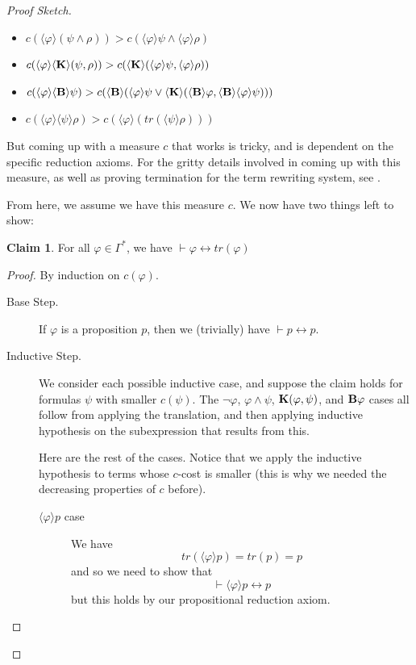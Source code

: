 \documentclass[letterpaper]{article}
\theoremstyle{definition}
\newtheorem{claim}{Claim}
\newenvironment{sketch}{\begin{proof}[Proof Sketch]}{\end{proof}}
\newcommand{\proves}{\vdash}
\newcommand{\Believe}[1]{\textrm{\textup{\textbf{B}}} #1}
\newcommand{\Know}[2]{\textrm{\textup{\textbf{K}}}(#1, #2)}
\newcommand{\diaBelieve}[1]{\langle \textrm{\textup{\textbf{B}}} \rangle #1}
\newcommand{\diaKnow}[2]{\langle \textrm{\textup{\textbf{K}}} \rangle(#1, #2)}
\newcommand{\diaHebbop}[1]{\langle #1\rangle}
\begin{document}
\begin{sketch}
\begin{itemize}
        \item $c(\diaHebbop{\varphi} (\psi \land \rho)) > c(\diaHebbop{\varphi} \psi \land \diaHebbop{\varphi} \rho)$
        \item $c(\diaHebbop{\varphi} \diaKnow{\psi}{\rho}) > c(\diaKnow{\diaHebbop{\varphi} \psi}{\diaHebbop{\varphi} \rho})$
        \item $c(\diaHebbop{\varphi} \diaBelieve{\psi}) > c(\diaBelieve{(\diaHebbop{\varphi} \psi \lor \diaKnow{\diaBelieve{\varphi}}{\diaBelieve{\diaHebbop{\varphi} \psi})}})$
        \item $c(\diaHebbop{\varphi} \diaHebbop{\psi} \rho) > c(\diaHebbop{\varphi} (tr(\diaHebbop{\psi} \rho)))$
    \end{itemize}
    But coming up with a measure $c$ that works is tricky, and is dependent on the specific reduction axioms.  For the gritty details involved in coming up with this measure, as well as proving termination for the term rewriting system, see \cite{logicsforepistemicactions}.

    From here, we assume we have this measure $c$.  We now have two things left to show:
    \begin{claim}
        For all $\varphi \in \Gamma^\ast$, we have $\proves \varphi \leftrightarrow tr(\varphi)$
    \end{claim}
    \begin{proof}
        By induction on $c(\varphi)$.
        \begin{description}
            \item[Base Step.] If $\varphi$ is a proposition $p$, then we (trivially) have $\proves p \leftrightarrow p$.
            \item[Inductive Step.] We consider each possible inductive case, and suppose the claim holds for formulas $\psi$ with smaller $c(\psi)$.  The $\neg \varphi$, $\varphi \land \psi$, $\Know{\varphi}{\psi}$, and $\Believe{\varphi}$ cases all follow from applying the translation, and then applying inductive hypothesis on the subexpression that results from this.

            Here are the rest of the cases.  Notice that we apply the inductive hypothesis to terms whose $c$-cost is smaller (this is why we needed the decreasing properties of $c$ before).
            \begin{description}
                \item[$\diaHebbop{\varphi} p$ case] We have
                \[ tr(\diaHebbop{\varphi} p) = tr(p) = p\]
                and so we need to show that
                \[ \proves \diaHebbop{\varphi} p \leftrightarrow p \]
                but this holds by our propositional reduction axiom.
                

\end{description}
\end{description}
\end{proof}
\end{sketch}
\end{document}
